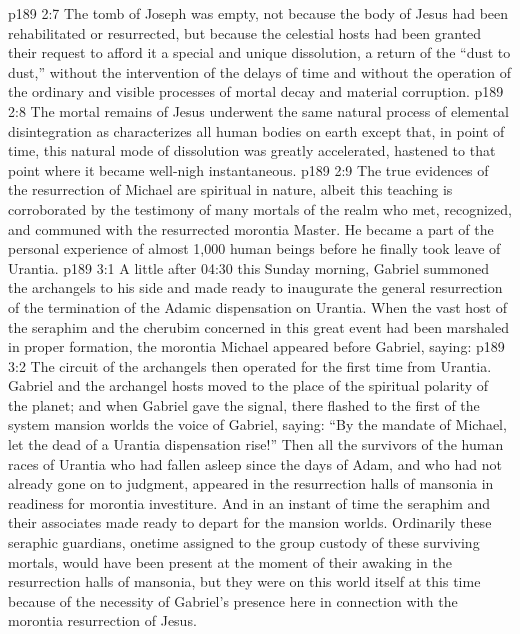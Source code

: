 \vs p189 2:7 The tomb of Joseph was empty, not because the body of Jesus had been rehabilitated or resurrected, but because the celestial hosts had been granted their request to afford it a special and unique dissolution, a return of the “dust to dust,” without the intervention of the delays of time and without the operation of the ordinary and visible processes of mortal decay and material corruption.
\vs p189 2:8 The mortal remains of Jesus underwent the same natural process of elemental disintegration as characterizes all human bodies on earth except that, in point of time, this natural mode of dissolution was greatly accelerated, hastened to that point where it became well\hyp{}nigh instantaneous.
\vs p189 2:9 The true evidences of the resurrection of Michael are spiritual in nature, albeit this teaching is corroborated by the testimony of many mortals of the realm who met, recognized, and communed with the resurrected morontia Master. He became a part of the personal experience of almost 1,000 human beings before he finally took leave of Urantia.
\vs p189 3:1 A little after 04:30 this Sunday morning, Gabriel summoned the archangels to his side and made ready to inaugurate the general resurrection of the termination of the Adamic dispensation on Urantia. When the vast host of the seraphim and the cherubim concerned in this great event had been marshaled in proper formation, the morontia Michael appeared before Gabriel, saying: 
\vs p189 3:2 The circuit of the archangels then operated for the first time from Urantia. Gabriel and the archangel hosts moved to the place of the spiritual polarity of the planet; and when Gabriel gave the signal, there flashed to the first of the system mansion worlds the voice of Gabriel, saying: “By the mandate of Michael, let the dead of a Urantia dispensation rise!” Then all the survivors of the human races of Urantia who had fallen asleep since the days of Adam, and who had not already gone on to judgment, appeared in the resurrection halls of mansonia in readiness for morontia investiture. And in an instant of time the seraphim and their associates made ready to depart for the mansion worlds. Ordinarily these seraphic guardians, onetime assigned to the group custody of these surviving mortals, would have been present at the moment of their awaking in the resurrection halls of mansonia, but they were on this world itself at this time because of the necessity of Gabriel’s presence here in connection with the morontia resurrection of Jesus.
